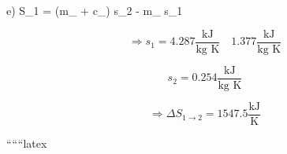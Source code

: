 e) \quad \Delta S_{1} = (m_{} + c_{}) s_2 - m_{} s_1

\[
\Rightarrow s_1 = 4.287 \frac{\text{kJ}}{\text{kg K}} \quad 1.377 \frac{\text{kJ}}{\text{kg K}}
\]

\[
s_2 = 0.254 \frac{\text{kJ}}{\text{kg K}}
\]

\[
\Rightarrow \Delta S_{1\rightarrow2} = 1547.5 \frac{\text{kJ}}{\text{K}}
\]

``````latex
